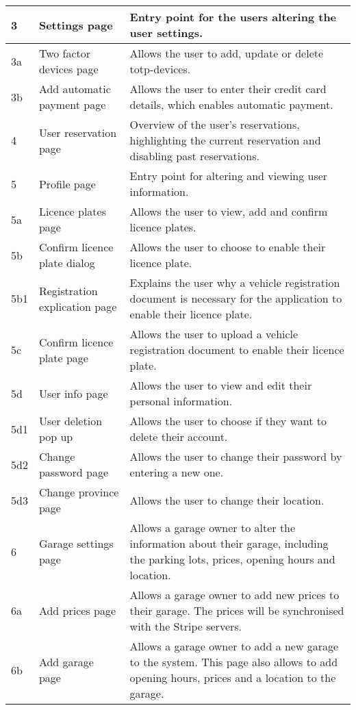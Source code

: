 \begin{table}
\begin{tabular}{|p{2cm}|p{4cm}|p{9cm}|}
         \hline 
         \hline
         3 & Settings page & Entry point for the users altering the user settings. \\
         \hline 
         3a & Two factor devices page & Allows the user to add, update or delete \ac{totp}-devices. \\
         \hline 
         3b & Add automatic payment page& Allows the user to enter their credit card details, which enables automatic payment.\\
         \hline 
         \hline
         4 & User reservation page & Overview of the user's reservations, highlighting the current reservation and disabling past reservations.\\
         \hline 
         \hline
         5 & Profile page & Entry point for altering and viewing user information. \\
         \hline 
         5a & Licence plates page & Allows the user to view, add and confirm licence plates. \\
         \hline 
         5b & Confirm licence plate dialog& Allows the user to choose to enable their licence plate. \\
         \hline 
         5b1 & Registration explication page & Explains the user why a vehicle registration document is necessary for the application to enable their licence plate.\\
         \hline 
         5c & Confirm licence plate page & Allows the user to upload a vehicle registration document to enable their licence plate. \\
         \hline 
         5d & User info page & Allows the user to view and edit their personal information. \\
         \hline 
         5d1 & User deletion pop up & Allows the user to choose if they want to delete their account. \\
         \hline 
         5d2 & Change password page & Allows the user to change their password by entering a new one. \\
         \hline
         5d3 & Change province page & Allows the user to change their location.\\
         \hline 
         \hline
         6 & Garage settings page & Allows a garage owner to alter the information about their garage, including the parking lots, prices, opening hours and location. \\
         \hline 
         6a & Add prices page & Allows a garage owner to add new prices to their garage. The prices will be synchronised with the Stripe servers.\\
         \hline
         6b & Add garage page & Allows a garage owner to add a new garage to the system. This page also allows to add opening hours, prices and a location to the garage.\\
         \hline 
    \end{tabular}
\end{table}
\clearpage

